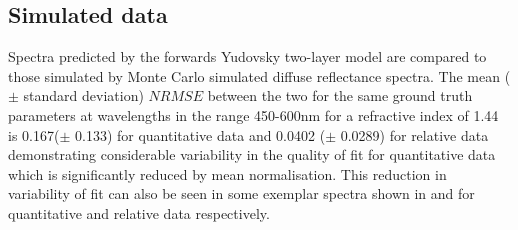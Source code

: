 \subsection{Simulated data}\label{sec:resultsMC2}
Spectra predicted by the forwards Yudovsky two-layer model are compared to those simulated by Monte Carlo simulated diffuse reflectance spectra. The mean ($\pm$ standard deviation) $NRMSE$ between the two for the same ground truth parameters at wavelengths in the range 450-600nm for a refractive index of 1.44 is 0.167($\pm$ 0.133) for quantitative data and 0.0402 ($\pm$ 0.0289) for relative data demonstrating considerable variability in the quality of fit for quantitative data which is significantly reduced by mean normalisation. This reduction in variability of fit can also be seen in some exemplar spectra shown in  and  for quantitative and relative data respectively. 
